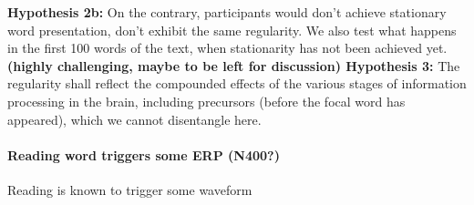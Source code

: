 {\bf Hypothesis 2b:} On the contrary, participants would don't achieve stationary word presentation, don't exhibit the same regularity. We also test what happens in the first 100 words of the text, when stationarity has not been achieved yet.\\

{\bf (highly challenging, maybe to be left for discussion) Hypothesis 3:} The regularity shall reflect the compounded effects of the various stages of information processing in the brain, including precursors (before the focal word has appeared), which we cannot disentangle here.\\



\paragraph{Reading word triggers some ERP (N400?)} Reading is known to trigger some waveform




